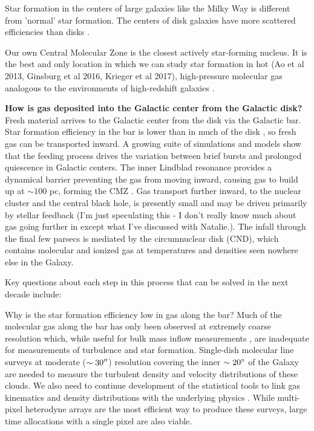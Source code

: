 \documentclass[modern]{aastex62}
\def\agnote#1{{\color{red}#1}}
\begin{document}
Star formation in the centers of large galaxies like the Milky Way is different from 'normal' star formation. %
The centers of disk galaxies have more scattered efficiencies than disks \citep{Leroy2013a}. 

Our own Central Molecular Zone is the closest actively star-forming nucleus.
It is the best and only location in which we can study star formation in hot
(Ao et al 2013, Ginsburg et al 2016, Krieger et al 2017), high-pressure
molecular gas analogous to the environments of high-redshift galaxies \citep{Kruijssen2013a}.






\textbf{How is gas deposited into the Galactic center from the Galactic disk?}
Fresh material arrives to the Galactic center from the disk via the Galactic bar.
Star formation efficiency in the bar is lower than in much of the disk
\citep[e.g.][]{Rieko2018a}, so fresh gas can be transported inward.
A growing suite of simulations and models
\citep{Krumholz2015a,Sormani2015a,Torrey2016a,Ridley2017a,Krumholz2017a,Sormani2018a,Jeffreson2018a}
show that the feeding process drives the variation between brief bursts and
prolonged quiescence in Galactic centers.  The inner Lindblad resonance provides
a dynamical barrier preventing the gas from moving inward, causing gas to build
up at $\sim100$ pc, forming the CMZ \citep{Krumholz2015a}.  Gas transport further
inward, to the nuclear cluster and the central black hole, is presently small
and may be driven primarily by stellar feedback \agnote{(I'm just speculating
this - I don't really know much about gas going further in except what I've
discussed with Natalie.)}.  The infall through the final few parsecs
is mediated by the circumnuclear disk (CND), which contains molecular and ionized
gas at temperatures and densities seen nowhere else in the Galaxy.


Key questions about each step in this process that can be solved in the next
decade include:

Why is the star formation efficiency low in gas along the bar?
Much of the molecular gas along the bar has only been observed at extremely
coarse resolution which, while useful for bulk mass inflow measurements
\citep[e.g.][]{Sormani2019a}, are inadequate for measurements of turbulence and
star formation.  Single-dish molecular line surveys at moderate
($\sim30\mbox{$^{\prime\prime}$}$) resolution covering the inner $\sim20^{\circ}$ of the Galaxy are
needed to measure the turbulent density and velocity distributions of these
clouds.  We also need to continue development of the statistical tools to link gas kinematics and
density distributions with the underlying physics
\citep{Koch2017a,Burkhart2018a}. While multi-pixel heterodyne arrays are the
most efficient way to produce these surveys, large time allocations with a
single pixel are also viable.
\end{document}
